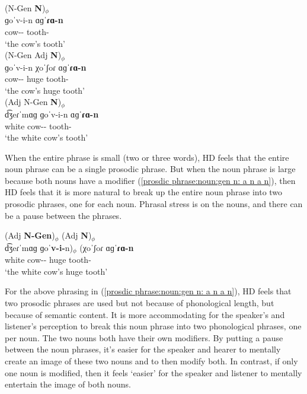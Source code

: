 \begin{exe}
	\ex 
	\begin{xlist}
		\ex \glll (N-Gen \textbf{N})$_\phi$  \\
		ɡoˈv-i-n ɑɡˈ\textbf{ɾɑ-n}  \\
		cow-{\gen}-{} tooth-{} \\
		\trans `the cow's tooth' \label{prosdic phrase:noun:gen n: n n} 
		\\ 
		\ex \glll (N-Gen Adj \textbf{N})$_\phi$  \\
		ɡoˈv-i-n  χoˈʃoɾ ɑɡˈ\textbf{ɾɑ-n} \\
		cow-{\gen}-{} huge tooth-{} \\
		\trans `the cow's huge tooth' \label{prosdic phrase:noun:gen n: n a n} 
		\\ 
		\ex \glll (Adj N-Gen   \textbf{N})$_\phi$  \\
		d͡ʒeɾˈmɑɡ  ɡoˈv-i-n  ɑɡˈ\textbf{ɾɑ-n} \\ 
		white cow-{\gen}-{}   tooth-{} \\
		\trans `the white cow's  tooth' \label{prosdic phrase:noun:gen n: a n n} 
		\\ 
	\end{xlist}
\end{exe}

When the entire phrase is small (two or three words), HD feels that the entire noun phrase can be a single prosodic phrase. But when the noun phrase is large because both nouns have a modifier (\ref{prosdic phrase:noun:gen n: a n a n}), then HD feels that it is more natural to break up the entire noun phrase into two prosodic phrases, one for each noun.  Phrasal  stress is on the nouns, and there can be a  pause between the phrases. 

\begin{exe}
	\ex \glll (Adj \textbf{N-Gen})$_\phi$ (Adj   \textbf{N})$_\phi$  \\
	d͡ʒeɾˈmɑɡ  ɡo\textbf{ˈv-i-}n)$_\phi$ (χoˈʃoɾ  ɑɡˈ\textbf{ɾɑ-n}  \\ 
	white cow-{\gen}-{}  huge  tooth-{} \\
	\trans `the white cow's huge  tooth' \label{prosdic phrase:noun:gen n: a n a n} 
	\\ 
\end{exe}

For the above phrasing in (\ref{prosdic phrase:noun:gen n: a n a n}), HD feels that two prosodic phrases are used but not because of phonological length,  but because of semantic content. It is more accommodating for the speaker's and listener's perception to break this noun phrase into two phonological phrases, one per noun. The two nouns both have their own modifiers. By putting a pause between the noun phrases, it's easier for the speaker and hearer to mentally create an image of these two nouns and to then modify both. In contrast, if only one noun is modified, then it feels `easier' for the speaker and listener to mentally entertain the image of both nouns. 


